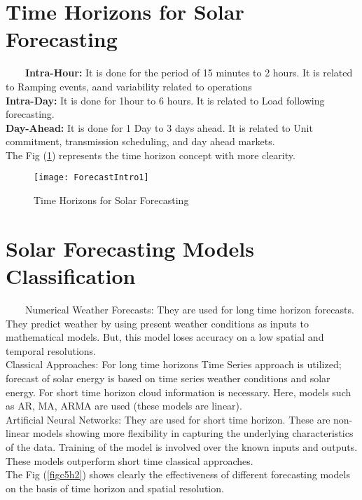 
\section{Time Horizons for Solar Forecasting}
\
\
\
\
\textbf{Intra-Hour:} It is done for the period of 15 minutes to 2 hours. It is related to Ramping events, aand variability related to operations\\
\textbf{Intra-Day:} It is done for 1hour to 6 hours. It is related to Load following forecasting.\\
\textbf{Day-Ahead:} It is done for 1 Day to 3 days ahead. It is related to Unit commitment, transmission scheduling, and day ahead markets.\\

The Fig (\ref{figc5h1}) represents the time horizon concept with more clearity.

\begin{figure}[H]
\centering
\texttt{[image: ForecastIntro1]}
\caption{Time Horizons for Solar Forecasting}
\label{figc5h1} %
\end{figure}

\section{Solar Forecasting Models Classification}
\
\
\
\
Numerical Weather Forecasts: They are used for long time horizon forecasts. They predict weather by using present weather conditions as inputs to mathematical models. But, this model loses accuracy on a low spatial and temporal resolutions.\\

Classical Approaches: For long time horizons Time Series approach is utilized; forecast of solar energy is based on time series weather conditions and solar energy. For short time horizon cloud information is necessary. Here, models such as AR, MA, ARMA are used (these models are linear).\\

Artificial Neural Networks: They are used for short time horizon. These are non-linear models showing more flexibility in capturing the underlying characteristics of the data. Training of the model is involved over the known inputs and outputs. These models outperform short time classical approaches.\\

The Fig (\ref{figc5h2}) shows clearly the effectiveness of different forecasting models on the basis of time horizon and spatial resolution.


